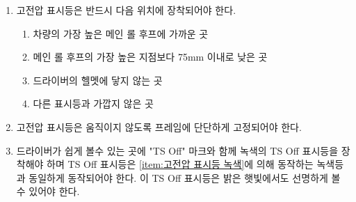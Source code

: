 \documentclass[final,a4paper,10pt]{report}
\begin{document}
\begin{enumerate}
  \item\label{rule:formula-technical.tractive-system-active-light.mounting-location} 고전압 표시등은 반드시 다음 위치에 장착되어야 한다.
    \begin{enumerate}
      \item\label{rule:formula-technical.tractive-system-active-light.mounting-location.near-highest-main-hoop} 차량의 가장 높은 메인 롤 후프에 가까운 곳
      \item\label{rule:formula-technical.tractive-system-active-light.mounting-location.below-hoop-apex-75mm} 메인 롤 후프의 가장 높은 지점보다 75mm 이내로 낮은 곳
      \item\label{rule:formula-technical.tractive-system-active-light.mounting-location.clear-of-helmet} 드라이버의 헬멧에 닿지 않는 곳
      \item\label{rule:formula-technical.tractive-system-active-light.mounting-location.away-from-other-lights} 다른 표시등과 가깝지 않은 곳
    \end{enumerate}

  \item\label{rule:formula-technical.tractive-system-active-light.securely-fixed-to-frame} 고전압 표시등은 움직이지 않도록 프레임에 단단하게 고정되어야 한다.
  \item\label{rule:formula-technical.tractive-system-active-light.ts-off-indicator-visible} 드라이버가 쉽게 볼수 있는 곳에 "TS Off" 마크와 함께 녹색의 TS Off 표시등을 장착해야 하며 TS Off 표시등은 \ref{item:고전압 표시등 녹색}에 의해 동작하는 녹색등과 동일하게 동작되어야 한다. 이 TS Off 표시등은 밝은 햇빛에서도 선명하게 볼 수 있어야 한다.
\end{enumerate}
\end{document}
